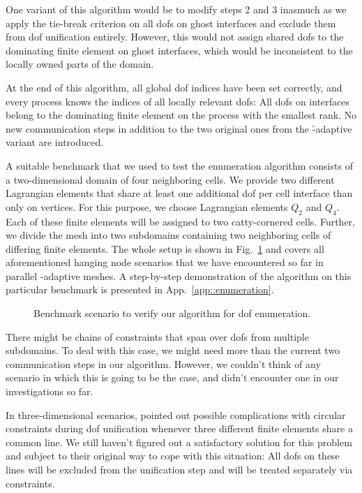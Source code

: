 One variant of this algorithm would be to modify steps 2 and 3 inasmuch as we apply the tie-break criterion on all \glspl{dof} on ghost interfaces and exclude them from \gls{dof} unification entirely. However, this would not assign shared \glspl{dof} to the dominating finite element on ghost interfaces, which would be inconsistent to the locally owned parts of the domain.

At the end of this algorithm, all global \gls{dof} indices have been set correctly, and every process knows the indices of all locally relevant \glspl{dof}: All \glspl{dof} on interfaces belong to the dominating finite element on the process with the smallest rank. No new communication steps in addition to the two original ones from the \h-adaptive variant are introduced.

A suitable benchmark that we used to test the enumeration algorithm consists of a two-dimensional domain of four neighboring cells. We provide two different Lagrangian elements that share at least one additional \gls{dof} per cell interface than only on vertices. For this purpose, we choose Lagrangian elements $Q_2$ and $Q_4$. Each of these finite elements will be assigned to two catty-cornered cells. Further, we divide the mesh into two subdomains containing two neighboring cells of differing finite elements. The whole setup is shown in Fig.~\ref{fig:enumbenchmark} and covers all aforementioned hanging node scenarios that we have encountered so far in parallel \hp-adaptive meshes. A step-by-step demonstration of the algorithm on this particular benchmark is presented in App.~\ref{app::enumeration}.

\begin{figure}
\centering


\caption{Benchmark scenario to verify our algorithm for \gls{dof} enumeration.}
\label{fig:enumbenchmark}
\end{figure}

There might be chains of constraints that span over \glspl{dof} from multiple subdomains. To deal with this case, we might need more than the current two communication steps in our algorithm. However, we couldn't think of any scenario in which this is going to be the case, and didn't encounter one in our investigations so far.

In three-dimensional scenarios, \textcite[Sec.~4.6]{bangerth2009} pointed out possible complications with circular constraints during \gls{dof} unification whenever three different finite elements share a common line. We still haven't figured out a satisfactory solution for this problem and subject to their original way to cope with this situation: All \glspl{dof} on these lines will be excluded from the unification step and will be treated separately via constraints.